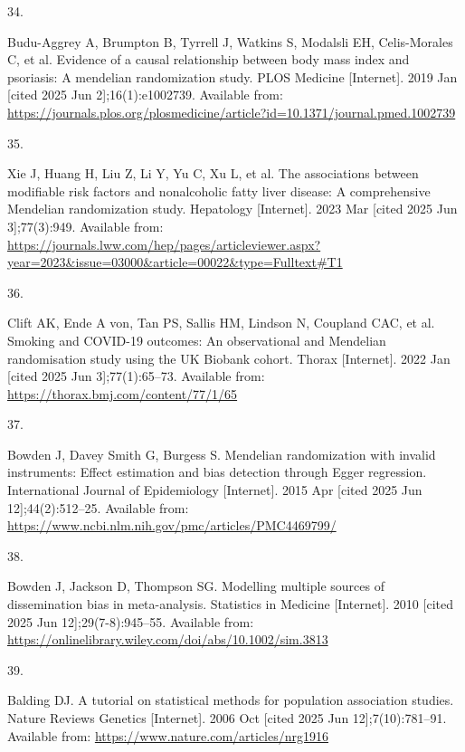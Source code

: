 \documentclass[
]{article}
\newlength{\cslhangindent}
\newlength{\csllabelwidth}
\newenvironment{CSLReferences}[2] %
 {\begin{list}{}{%
  \setlength{\itemindent}{0pt}
  \setlength{\leftmargin}{0pt}
  \setlength{\parsep}{0pt}
  \ifodd #1
   \setlength{\leftmargin}{\cslhangindent}
   \setlength{\itemindent}{-1\cslhangindent}
  \fi
  \setlength{\itemsep}{#2\baselineskip}}}
 {\end{list}}
\newcommand{\CSLLeftMargin}[1]{\parbox[t]{\csllabelwidth}{\strut#1\strut}}
\newcommand{\CSLRightInline}[1]{\parbox[t]{\linewidth - \csllabelwidth}{\strut#1\strut}}
\begin{document}
\begin{CSLReferences}{0}{1}
\CSLLeftMargin{34. }%
\CSLRightInline{Budu-Aggrey A, Brumpton B, Tyrrell J, Watkins S, Modalsli EH, Celis-Morales C, et al. Evidence of a causal relationship between body mass index and psoriasis: {A} mendelian randomization study. PLOS Medicine {[}Internet{]}. 2019 Jan {[}cited 2025 Jun 2{]};16(1):e1002739. Available from: \url{https://journals.plos.org/plosmedicine/article?id=10.1371/journal.pmed.1002739}}

\CSLLeftMargin{35. }%
\CSLRightInline{Xie J, Huang H, Liu Z, Li Y, Yu C, Xu L, et al. The associations between modifiable risk factors and nonalcoholic fatty liver disease: {A} comprehensive {Mendelian} randomization study. Hepatology {[}Internet{]}. 2023 Mar {[}cited 2025 Jun 3{]};77(3):949. Available from: \url{https://journals.lww.com/hep/pages/articleviewer.aspx?year=2023&issue=03000&article=00022&type=Fulltext\#T1}}

\CSLLeftMargin{36. }%
\CSLRightInline{Clift AK, Ende A von, Tan PS, Sallis HM, Lindson N, Coupland CAC, et al. Smoking and {COVID}-19 outcomes: An observational and {Mendelian} randomisation study using the {UK} {Biobank} cohort. Thorax {[}Internet{]}. 2022 Jan {[}cited 2025 Jun 3{]};77(1):65--73. Available from: \url{https://thorax.bmj.com/content/77/1/65}}

\CSLLeftMargin{37. }%
\CSLRightInline{Bowden J, Davey Smith G, Burgess S. Mendelian randomization with invalid instruments: Effect estimation and bias detection through {Egger} regression. International Journal of Epidemiology {[}Internet{]}. 2015 Apr {[}cited 2025 Jun 12{]};44(2):512--25. Available from: \url{https://www.ncbi.nlm.nih.gov/pmc/articles/PMC4469799/}}

\CSLLeftMargin{38. }%
\CSLRightInline{Bowden J, Jackson D, Thompson SG. Modelling multiple sources of dissemination bias in meta-analysis. Statistics in Medicine {[}Internet{]}. 2010 {[}cited 2025 Jun 12{]};29(7-8):945--55. Available from: \url{https://onlinelibrary.wiley.com/doi/abs/10.1002/sim.3813}}

\CSLLeftMargin{39. }%
\CSLRightInline{Balding DJ. A tutorial on statistical methods for population association studies. Nature Reviews Genetics {[}Internet{]}. 2006 Oct {[}cited 2025 Jun 12{]};7(10):781--91. Available from: \url{https://www.nature.com/articles/nrg1916}}


\end{CSLReferences}
\end{document}
